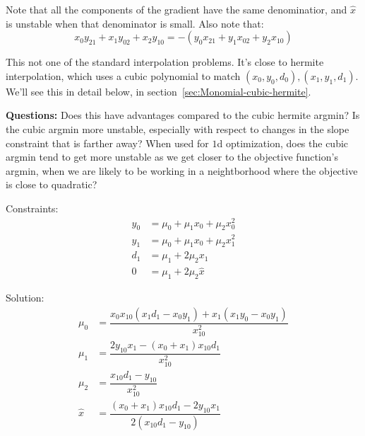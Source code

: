 Note that all the components of the gradient have the same 
denominatior, and
$\hat{x}$ is unstable when that denominator is small.
Also note that:
\begin{equation}
x_0 y_{21} + x_1 y_{02} + x_2 y_{10}
=
- \left(
y_0 x_{21} + y_1 x_{02} + y_2 x_{10}
\right)
\end{equation}


% 

\label{sec:monomial-yyd}

This not one of the standard interpolation problems.
It's close to hermite interpolation,
which uses a cubic polynomial to match
$(x_0,y_0,d_0),(x_1,y_1,d_1)$.
We'll see this in detail below,
in section~\ref{sec:Monomial-cubic-hermite}.

\textbf{Questions:}
Does this have advantages compared to the cubic hermite argmin?
Is the cubic argmin more
unstable, especially with respect to changes in the
slope constraint that is farther away?
When used for $1$d optimization,
does the cubic argmin tend to get more unstable as we get closer
to the objective function's argmin, 
when we are likely to be working in a neightborhood where
the objective is close to quadratic?

% 

Constraints:
\begin{align}
y_0 & = \mu_0+\mu_1 x_0+\mu_2 x_0^{2}  
\\
y_1 & = \mu_0+\mu_1 x_0+\mu_2 x_1^{2}  
\nonumber
\\
d_1 & = \mu_1 + 2 \mu_2 x_1  
\nonumber
\\
0 & = \mu_1 + 2 \mu_2 \hat{x}  
\nonumber
\end{align}

Solution:
\begin{align}
\mu_0 & =
\dfrac{
x_0 x_{10} \left( x_1 d_1 - x_0 y_1 \right) 
+ x_1 \left( x_1 y_0 - x_0 y_1 \right)
}{x_{10}^{2}}
\\
\mu_1 & =
\dfrac{2 y_{10} x_1 - \left(x_0+x_1\right) x_{10} d_1}{x_{10}^{2}}
\nonumber
\\
\mu_2 & = \dfrac{x_{10} d_1 - y_{10}}{x_{10}^{2}}
\nonumber 
\\
\hat{x} & =
\dfrac{
\left(x_0+x_1\right) x_{10} d_1 - 2 y_{10} x_1
}{2 \left(x_{10} d_1 - y_{10} \right)}
\nonumber 
\end{align}

